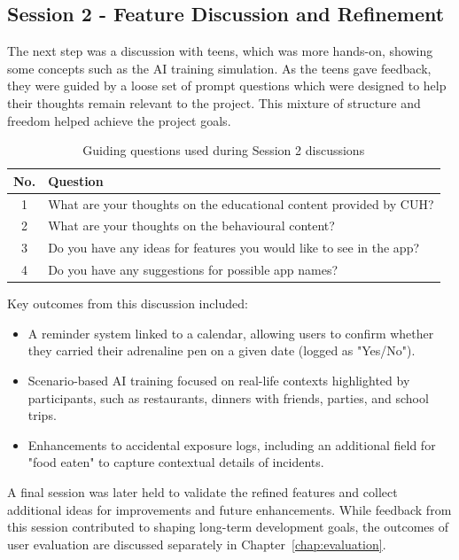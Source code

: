 \documentclass[MScCS]{uccthesis}
\begin{document}
\subsection*{Session 2 - Feature Discussion and Refinement}
The next step was a discussion with teens, which was more hands-on, showing some concepts such as the AI training simulation. As the teens gave feedback, they were guided by a loose set of prompt questions which were designed to help their thoughts remain relevant to the project. This mixture of structure and freedom helped achieve the project goals.
 

\begin{table}[htbp]
\centering
\small
\caption{Guiding questions used during Session 2 discussions}
\label{tab:ppi-session2-questions}
\renewcommand{\arraystretch}{1.2}
\begin{tabular}{|c|p{10cm}|}
\hline
\textbf{No.} & \textbf{Question} \\
\hline
1 & What are your thoughts on the educational content provided by CUH? \\
2 & What are your thoughts on the behavioural content? \\
3 & Do you have any ideas for features you would like to see in the app? \\
4 & Do you have any suggestions for possible app names? \\
\hline
\end{tabular}
\end{table}

Key outcomes from this discussion included:  
\begin{itemize}
    \item A reminder system linked to a calendar, allowing users to confirm whether they carried their adrenaline pen on a given date (logged as "Yes/No").
    \item Scenario-based AI training focused on real-life contexts highlighted by participants, such as restaurants, dinners with friends, parties, and school trips.
    \item Enhancements to accidental exposure logs, including an additional field for "food eaten" to capture contextual details of incidents.
\end{itemize}

A final session was later held to validate the refined features and collect additional ideas for improvements and future enhancements. While feedback from this session contributed to shaping long-term development goals, the outcomes of user evaluation are discussed separately in Chapter~\ref{chap:evaluation}.
\end{document}
